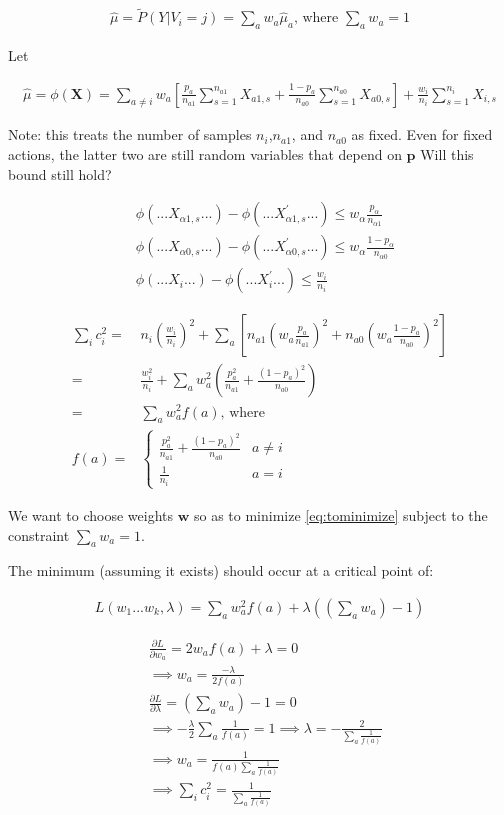 \documentclass{article}
\newcommand{\eqn}[1]{\begin{align}#1\end{align}}
\theoremstyle{plain}
\theoremstyle{definition}
\begin{document}
\eqn {
\hat{\mu} = \tilde{P}(Y|V_i = j)= \sum_a w_a \hat{\mu}_a \text{, where } \sum_a w_a = 1
}

Let 

\eqn {
\hat{\mu} = \phi(\boldsymbol{X}) = \sum_{a \neq i} w_a \left[ 
\frac{p_a}{n_{a1}}\sum_{s=1}^{n_{a1}}X_{a1,s} + \frac{1-p_a}{n_{a0}}\sum_{s=1}^{n_{a0}}X_{a0,s}
\right] + \frac{w_i}{n_i} \sum_{s=1}^{n_i}X_{i,s}
}

Note: this treats the number of samples $n_i$,$n_{a1}$, and $n_{a0}$ as fixed. Even for fixed actions, the latter two are still random variables that depend on $\boldsymbol{p}$  Will this bound still hold?  



\eqn {
&\phi(...X_{\alpha 1,s}...) - \phi(...X_{\alpha 1,s}^{'}...) \leq w_\alpha \frac{p_\alpha}{n_{\alpha 1}} \\
&\phi(...X_{\alpha 0,s}...) - \phi(...X_{\alpha 0,s}^{'}...) \leq w_\alpha \frac{1-p_\alpha}{n_{\alpha 0}}\\
& \phi(...X_i...) - \phi(...X_i^{'}...) \leq \frac{w_i}{n_i}
}


\eqn{
\sum_i c_i^2 = & n_i \left(\frac{w_i}{n_i}\right)^2+ \sum_a \left[ n_{a1}\left(w_a \frac{p_a}{n_{a1}}\right)^2 + n_{a0}\left(w_a \frac{1-p_a}{n_{a0}}\right)^2\right]\\
= & \frac{w_i^2}{n_i}+ \sum_a w_a^2 \left(\frac{p_a^2}{n_{a1}}+  \frac{(1-p_a)^2}{n_{a0}} \right) \\
\label{eq:tominimize}
= & \sum_a w_a^2 f(a) \text{, where }\\ 
f(a) =& \begin{cases}
\frac{p_a^2}{n_{a1}}+  \frac{(1-p_a)^2}{n_{a0}}  & a \neq i\\
\frac{1}{n_i} & a = i
\end{cases}
}

We want to choose weights $\boldsymbol{w}$ so as to minimize \ref{eq:tominimize} subject to the constraint $\sum_a w_a = 1$.


The minimum (assuming it exists) should occur at a critical point of:

\eqn {
L(w_1...w_k,\lambda) = \sum_a w_a^2 f(a) + \lambda((\sum_a w_a)-1)
}

\eqn{
& \frac{\partial L}{\partial w_a}  = 2 w_a f(a) + \lambda = 0 \\
& \implies w_a =  \frac{-\lambda}{2 f(a)}\\
& \frac{\partial L}{\partial \lambda}  = (\sum_a w_a)-1= 0 \\
& \implies -\frac{\lambda}{2}\sum_a \frac{1}{f(a)} = 1
 \implies \lambda = -\frac{2}{\sum_a \frac{1}{f(a)}}\\
& \implies w_a = \frac{1}{f(a)\sum_a \frac{1}{f(a)}} \\
\label{eqn:sumofsquares}
& \implies \sum_i c_i^2 = \frac{1}{\sum_a \frac{1}{f(a)}} 
}
\end{document}
